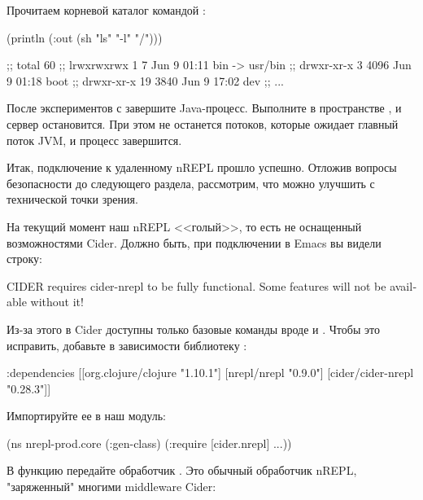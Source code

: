 Прочитаем корневой каталог командой :

\begin{english}
  \begin{text}
(println (:out (sh "ls" "-l" "/")))

;; total 60
;; lrwxrwxrwx   1    7 Jun  9 01:11 bin -> usr/bin
;; drwxr-xr-x   3 4096 Jun  9 01:18 boot
;; drwxr-xr-x  19 3840 Jun  9 17:02 dev
;; ...
  \end{text}
\end{english}

После экспериментов с  завершите Java-процесс. Выполните  в пространстве , и сервер остановится. При этом не останется потоков, которые ожидает главный поток JVM, и процесс завершится.

Итак, подключение к удаленному nREPL прошло успешно. Отложив вопросы безопасности до следующего раздела, рассмотрим, что можно улучшить с технической точки зрения.

На текущий момент наш nREPL <<голый>>, то есть не оснащенный возможностями Cider. Должно быть, при подключении в Emacs вы видели строку:

\begin{english}
  \begin{text}
CIDER requires cider-nrepl to be fully functional.
Some features will not be available without it!
  \end{text}
\end{english}

Из-за этого в Cider доступны только базовые команды вроде  и . Чтобы это исправить, добавьте в зависимости библиотеку :

\begin{english}
  \begin{clojure}
  :dependencies
  [[org.clojure/clojure "1.10.1"]
   [nrepl/nrepl "0.9.0"]
   [cider/cider-nrepl "0.28.3"]]
  \end{clojure}
\end{english}

Импортируйте ее в наш модуль:

\begin{english}
  \begin{clojure}
(ns nrepl-prod.core
  (:gen-class)
  (:require [cider.nrepl]
            ...))
  \end{clojure}
\end{english}

В функцию  передайте обработчик . Это обычный обработчик nREPL, "заряженный" многими middleware Cider:

